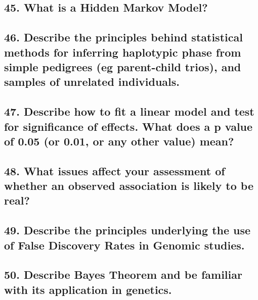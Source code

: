 \documentclass{tufte-handout}
\theoremstyle{noparens}
\begin{document}
\newpage
\subsection{45. What is a Hidden Markov Model?}

\newpage
\subsection{46. Describe the principles behind statistical methods for inferring haplotypic phase from simple pedigrees (eg parent-child trios), and samples of unrelated individuals.} 

\newpage
\subsection{47. Describe how to fit a linear model and test for significance of effects. What does a p value of 0.05 (or 0.01, or any other value) mean?} 

\newpage
\subsection{48. What issues affect your assessment of whether an observed association is likely to be real?}

\newpage
\subsection{49. Describe the principles underlying the use of False Discovery Rates in Genomic studies.}

\newpage
\subsection{50. Describe Bayes Theorem and be familiar with its application in genetics.}
\end{document}
